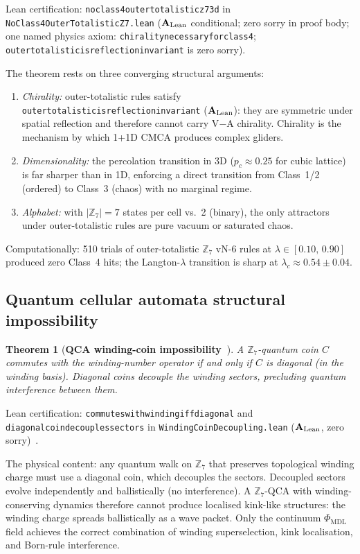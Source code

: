 \documentclass[11pt]{article}
\newtheorem{theorem}{Theorem}[section]
\theoremstyle{remark}
\newcommand{\PHIMDL}{\Phi_{\mathrm{MDL}}}
\newcommand{\ZS}{\mathbb{Z}_7}
\newcommand{\lean}[1]{%
  \penalty-100
  \begingroup\def\_{\textunderscore\allowbreak}\texttt{#1}\endgroup}
\newcommand{\CatAL}{\ensuremath{\textbf{A}_{\rm Lean}}}
\begin{document}
\noindent
Lean certification: \lean{no\_class4\_outer\_totalistic\_z7\_3d} in
\lean{NoClass4OuterTotalisticZ7.lean} ($\CatAL$ conditional; zero sorry in proof body;
one named physics axiom: \lean{chirality\_necessary\_for\_class4};
\lean{outer\_totalistic\_is\_reflection\_invariant} is zero sorry).

The theorem rests on three converging structural arguments:
\begin{enumerate}[noitemsep]
\item \textit{Chirality:} outer-totalistic rules satisfy
  \lean{outer\_totalistic\_is\_reflection\_invariant} ($\CatAL$): they are
  symmetric under spatial reflection and therefore cannot carry
  V$-$A chirality.  Chirality is the mechanism by which 1+1D CMCA produces
  complex gliders.
\item \textit{Dimensionality:} the percolation transition in 3D ($p_c\approx0.25$
  for cubic lattice) is far sharper than in 1D, enforcing a direct transition
  from Class~1/2 (ordered) to Class~3 (chaos) with no marginal regime.
\item \textit{Alphabet:} with $|\ZS|=7$ states per cell vs.\ 2 (binary),
  the only attractors under outer-totalistic rules are pure vacuum or saturated
  chaos.
\end{enumerate}

Computationally: 510 trials of outer-totalistic $\ZS$ vN-6 rules at
$\lambda\in[0.10,\,0.90]$ produced zero Class~4 hits; the Langton-$\lambda$
transition is sharp at $\lambda_c \approx 0.54\pm0.04$.

\subsection{Quantum cellular automata structural impossibility}

\begin{theorem}[\textbf{QCA winding-coin impossibility~\cite{SpivackPhiMDLField}}]
\label{thm:qca}
A $\ZS$-quantum coin $C$ commutes with the winding-number operator if and
only if $C$ is diagonal (in the winding basis).  Diagonal coins decouple the
winding sectors, precluding quantum interference between them.
\end{theorem}

\noindent
Lean certification: \lean{commutes\_with\_winding\_iff\_diagonal} and
\lean{diagonal\_coin\_decouples\_sectors} in \lean{WindingCoinDecoupling.lean}
($\CatAL$, zero sorry)~\cite{SpivackPhiMDLField}.

The physical content: any quantum walk on $\ZS$ that preserves topological
winding charge must use a diagonal coin, which decouples the sectors.
Decoupled sectors evolve independently and ballistically (no interference).
A $\ZS$-QCA with winding-conserving dynamics therefore cannot produce
localised kink-like structures: the winding charge spreads ballistically
as a wave packet.  Only the continuum $\PHIMDL$ field achieves the correct
combination of winding superselection, kink localisation, and Born-rule
interference.
\end{document}
